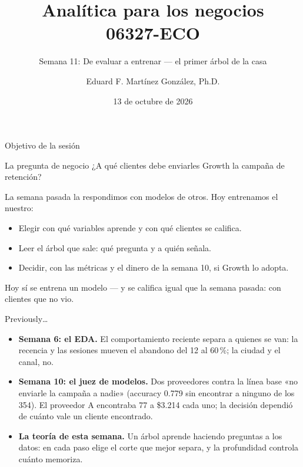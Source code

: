 \documentclass{beamer}
\title[06327-ECO]{Analítica para los negocios \\ 06327-ECO}
\subtitle{Semana 11: De evaluar a entrenar --- el primer árbol de la casa}
\author{Eduard F. Martínez González, Ph.D.}
\institute[]{Departamento de Economía, Universidad Icesi}
\date{13 de octubre de 2026}
\begin{document}
\begin{frame}
\titlepage
\end{frame}

\begin{frame}{Objetivo de la sesión}
\small
\begin{block}{La pregunta de negocio}
¿A qué clientes debe enviarles Growth la campaña de retención?
\end{block}

\vspace{0.2cm}
La semana pasada la respondimos con modelos de otros. Hoy entrenamos el nuestro:
\begin{itemize} \setlength{\itemsep}{0.15cm}
  \item Elegir con qué variables aprende y con qué clientes se califica.
  \item Leer el árbol que sale: qué pregunta y a quién señala.
  \item Decidir, con las métricas y el dinero de la semana 10, si Growth lo adopta.
\end{itemize}

\vspace{0.25cm}
\textcolor{azulcaso}{Hoy sí se entrena un modelo --- y se califica igual que la semana pasada: con clientes que no vio.}
\end{frame}

\begin{frame}{Previously\ldots}
\small
\begin{itemize} \setlength{\itemsep}{0.25cm}
  \item \textbf{Semana 6: el EDA.} El comportamiento reciente separa a quienes se van: la recencia y las sesiones mueven el abandono del 12 al 60\,\%; la ciudad y el canal, no.
  \item \textbf{Semana 10: el juez de modelos.} Dos proveedores contra la línea base «no enviarle la campaña a nadie» (accuracy 0.779 sin encontrar a ninguno de los 354). El proveedor A encontraba 77 a \$3.214 cada uno; la decisión dependió de cuánto vale un cliente encontrado.
  \item \textbf{La teoría de esta semana.} Un árbol aprende haciendo preguntas a los datos: en cada paso elige el corte que mejor separa, y la profundidad controla cuánto memoriza.
\end{itemize}
\end{frame}
\end{document}
